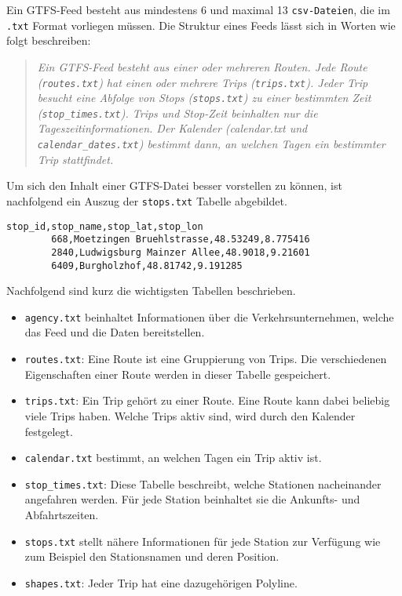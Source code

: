       Ein GTFS-Feed besteht aus mindestens 6 und maximal 13 \texttt{csv-Dateien}, die im \texttt{.txt} Format vorliegen müssen. Die Struktur eines Feeds lässt sich in Worten wie folgt beschreiben:

      \begin{quote}
        \textit{Ein GTFS-Feed besteht aus einer oder mehreren Routen. Jede Route (\texttt{routes.txt}) hat einen oder mehrere Trips (\texttt{trips.txt}). Jeder Trip besucht eine Abfolge von Stops (\texttt{stops.txt}) zu einer bestimmten Zeit (\texttt{stop\_times.txt}). Trips und Stop-Zeit beinhalten nur die Tageszeitinformationen. Der Kalender (calendar.txt und \texttt{calendar\_dates.txt}) bestimmt dann, an welchen Tagen ein bestimmter Trip stattfindet.} \cite[S. 8]{zervaas}
      \end{quote}

      Um sich den Inhalt einer GTFS-Datei besser vorstellen zu können, ist nachfolgend ein Auszug der \texttt{stops.txt} Tabelle abgebildet.

      \begin{lstlisting}[captionpos=b, caption=Auszug der ersten Zeilen von \texttt{stops.txt}, label=lst:gtfs-auszug]
        stop_id,stop_name,stop_lat,stop_lon
        668,Moetzingen Bruehlstrasse,48.53249,8.775416
        2840,Ludwigsburg Mainzer Allee,48.9018,9.21601
        6409,Burgholzhof,48.81742,9.191285
      \end{lstlisting}

      Nachfolgend sind kurz die wichtigsten Tabellen beschrieben.

      \begin{itemize}
        \item \texttt{agency.txt} beinhaltet Informationen über die Verkehrsunternehmen, welche das Feed und die Daten bereitstellen.

        \item \texttt{routes.txt}: Eine Route ist eine Gruppierung von Trips. Die verschiedenen Eigenschaften einer Route werden in dieser Tabelle gespeichert.

        \item \texttt{trips.txt}: Ein Trip gehört zu einer Route. Eine Route kann dabei beliebig viele Trips haben. Welche Trips aktiv sind, wird durch den Kalender festgelegt.

        \item \texttt{calendar.txt} bestimmt, an welchen Tagen ein Trip aktiv ist.

        \item \texttt{stop\_times.txt}: Diese Tabelle beschreibt, welche Stationen nacheinander angefahren werden. Für jede Station beinhaltet sie die Ankunfts- und Abfahrtszeiten.

        \item \texttt{stops.txt} stellt nähere Informationen für jede Station zur Verfügung wie zum Beispiel den Stationsnamen und deren Position.

        \item \texttt{shapes.txt}: Jeder Trip hat eine dazugehörigen Polyline.

      \end{itemize}

